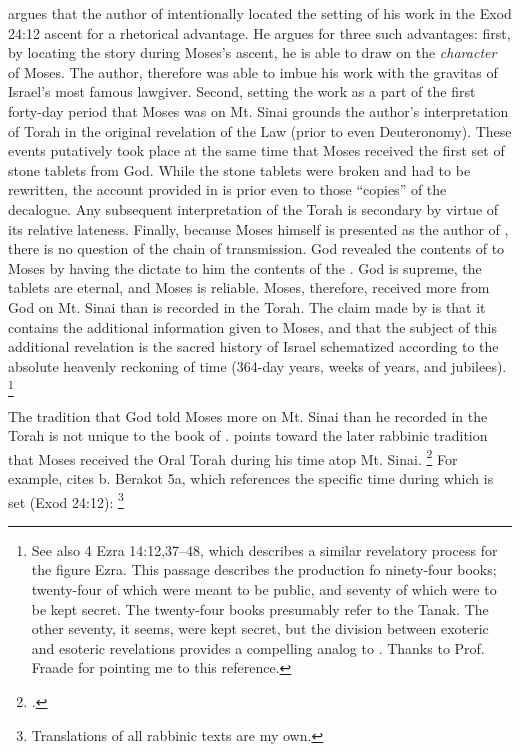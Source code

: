 \vanderkam argues that the author of \jub intentionally located the setting of his work in the Exod 24:12 ascent for a rhetorical advantage. He argues for three such advantages: first, by locating the story during Moses's ascent, he is able to draw on the \emph{character} of Moses. The author, therefore was able to imbue his work with the gravitas of Israel's most famous lawgiver. Second, setting the work as a part of the first forty-day period that Moses was on Mt. Sinai grounds the author's interpretation of Torah in the original revelation of the Law (prior to even Deuteronomy). These events putatively took place at the same time that Moses received the first set of stone tablets from God. While the stone tablets were broken and had to be rewritten, the account provided in \jub is prior even to those ``copies'' of the decalogue. Any subsequent interpretation of the Torah is secondary by virtue of its relative lateness. Finally, because Moses himself is presented as the author of \jub, there is no question of the chain of transmission. God revealed the contents of \jub to Moses by having the \ap dictate to him the contents of the \heavenlytablets. God is supreme, the tablets are eternal, and Moses is reliable. Moses, therefore, received more from God on Mt. Sinai than is recorded in the Torah. The claim made by \jub is that it contains the additional information given to Moses, and that the subject of this additional revelation is the sacred history of Israel schematized according to the absolute heavenly reckoning of time (364-day years, weeks of years, and jubilees).%
    \footnote{See also 4 Ezra 14:12,37--48, which describes a similar revelatory process for the figure Ezra. This passage describes the production fo ninety-four books; twenty-four of which were meant to be public, and seventy of which were to be kept secret. The twenty-four books presumably refer to the Tanak. The other seventy, it seems, were kept secret, but the division between exoteric and esoteric revelations provides a compelling analog to \jub. Thanks to Prof. Fraade for pointing me to this reference.}

The tradition that God told Moses more on Mt. Sinai than he recorded in the Torah is not unique to the book of \jub. \vanderkam points toward the later rabbinic tradition that Moses received the Oral Torah during his time atop Mt. Sinai.%
    \footnote{\Cite[28--31]{vanderkam_metso-etal2010}.}
For example, \vanderkam cites b. Berakot 5a, which references the specific time during which \jub is set (Exod 24:12):%
    \footnote{Translations of all rabbinic texts are my own.}

